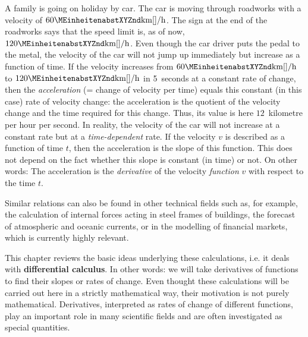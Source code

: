 

\Mtikzexternalize
{}





\begin{MSectionStart}

\MModstartBox
\end{MSectionStart}


\begin{MIntro}

A family is going on holiday by car. The car is moving through roadworks with a velocity of 
$60\MEinheit{km}[]/\MEinheit[]{h}$. The sign
at the end of the roadworks says that the speed limit is, as of now,  
$120\MEinheit{km}[]/\MEinheit[]{h}$. Even though the car driver puts the pedal to the metal,
the velocity of the car will not jump up immediately but increase as a function of time.
If the velocity increases from $60\MEinheit{km}[]/\MEinheit[]{h}$ to $120\MEinheit{km}[]/\MEinheit[]{h}$ 
 in 5~seconds at a constant rate of change, then
the \emph{acceleration} (= change of velocity per time) equals 
this constant (in this case) rate of velocity change: the acceleration is the quotient of 
the velocity change and the time required for this change. Thus, its value is here
$12$~kilometre per hour per second. In reality, the velocity of the car will not increase
at a constant rate but at a \emph{time-dependent} rate.
If the velocity $v$ is described as a function of time $t$, then the 
acceleration is the slope of this function. This does not depend on the fact 
whether this slope is constant (in time) or not. On other words: The acceleration
is the \emph{derivative} of the velocity \emph{function} $v$ with respect to the time $t$.

Similar relations can also be found in other technical fields such as, for example, the calculation of 
internal forces acting in steel frames of buildings, the forecast of atmospheric and oceanic 
currents, or in the modelling of financial markets, which is currently highly relevant.

This chapter reviews the basic ideas underlying these calculations, i.e. it deals with 
\textbf{differential calculus}. In other words: we will take derivatives of functions 
to find their slopes or rates of change. Even thought these calculations 
will be carried out here in a strictly mathematical way, their motivation is not 
purely mathematical. Derivatives, interpreted as rates of change of different functions,
play an important role in many scientific fields and are often investigated as special
quantities.

\end{MIntro}

